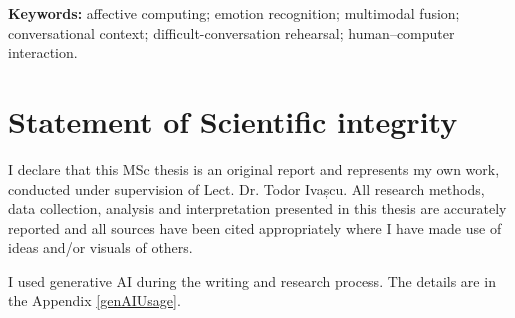 \documentclass[12pt,a4paper,openany]{book}
\theoremstyle{definition}
\theoremstyle{remark}
\begin{document}
\noindent\textbf{Keywords:} affective computing; emotion recognition; multimodal fusion; conversational context; difficult-conversation rehearsal; human--computer interaction.


\newpage

\section*{Statement of Scientific integrity} 

I declare that this MSc thesis is an original report and represents my own work, conducted under supervision of Lect. Dr. Todor Ivașcu. All research methods, data collection, analysis and interpretation presented in this thesis are accurately reported and all sources have been cited appropriately where I have made use of ideas and/or visuals of others.

I used generative AI during the writing and research process. The details are in the Appendix \ref{genAIUsage}.




\newpage
\normalsize{}

\tableofcontents

\clearpage
{}
{}
\listoffigures

\clearpage
{}
{}
\listoftables

\clearpage
\end{document}
